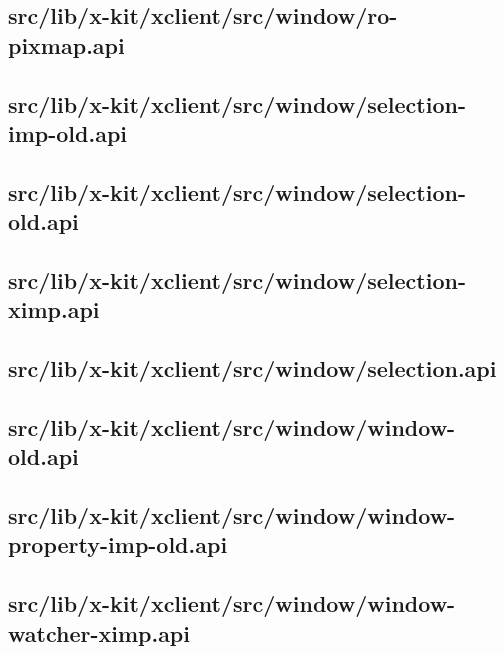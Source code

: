 \subsection{src/lib/x-kit/xclient/src/window/ro-pixmap.api}


\subsection{src/lib/x-kit/xclient/src/window/selection-imp-old.api}


\subsection{src/lib/x-kit/xclient/src/window/selection-old.api}


\subsection{src/lib/x-kit/xclient/src/window/selection-ximp.api}


\subsection{src/lib/x-kit/xclient/src/window/selection.api}


\subsection{src/lib/x-kit/xclient/src/window/window-old.api}


\subsection{src/lib/x-kit/xclient/src/window/window-property-imp-old.api}


\subsection{src/lib/x-kit/xclient/src/window/window-watcher-ximp.api}


